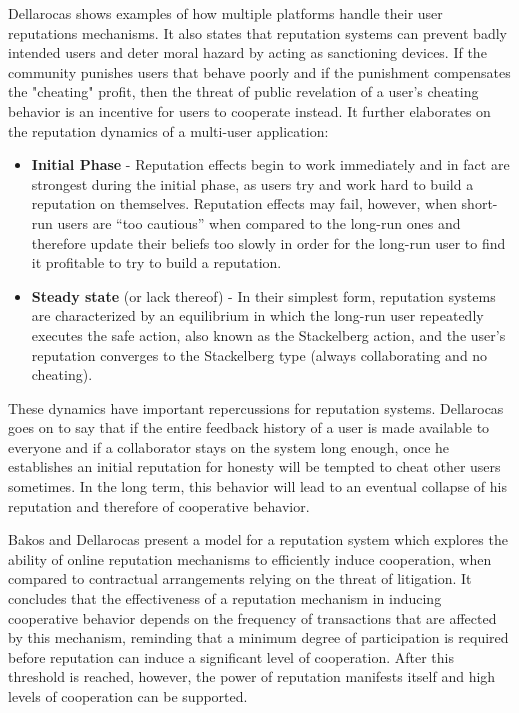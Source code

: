 Dellarocas \cite{Dellarocas2005-rep-mech} shows examples of how multiple platforms handle their user reputations mechanisms. It also states that reputation systems can prevent badly intended users and deter moral hazard by acting as sanctioning devices. If the community punishes users that behave poorly and if the punishment compensates the "cheating" profit, then the threat of public revelation of a user's cheating behavior is an incentive for users to cooperate instead. It further elaborates on the reputation dynamics of a multi-user application: 
\begin{itemize}
    \item \textbf{Initial Phase} - Reputation effects begin to work immediately and in fact are strongest during the initial phase, as users try and work hard to build a reputation on themselves. Reputation effects may fail, however, when short-run users are “too cautious” when compared to the long-run ones and therefore update their beliefs too slowly in order for the long-run user to find it profitable to try to build a reputation.
    \item \textbf{Steady state} (or lack thereof) - In their simplest form, reputation systems are characterized by an equilibrium in which the long-run user repeatedly executes the safe action, also known as the Stackelberg action, and the user's reputation converges to the Stackelberg type (always collaborating and no cheating).
\end{itemize}

These dynamics have important repercussions for reputation systems. Dellarocas goes on to say that if the entire feedback history of a user is made available to everyone and if a collaborator stays on the system long enough, once he establishes an initial reputation for honesty will be tempted to cheat other users sometimes. In the long term, this behavior will lead to an eventual collapse of his reputation and therefore of cooperative behavior.

Bakos and Dellarocas \cite{Bakos2003} present a model for a reputation system which explores the ability of online reputation mechanisms to efficiently induce cooperation, when compared to contractual arrangements relying on the threat of litigation. It concludes that the effectiveness of a reputation mechanism in inducing cooperative behavior depends on the frequency of transactions that are affected by this mechanism, reminding that a minimum degree of participation is required before reputation can induce a significant level of cooperation. After this threshold is reached, however, the power of reputation manifests itself and high levels of cooperation can be supported.

